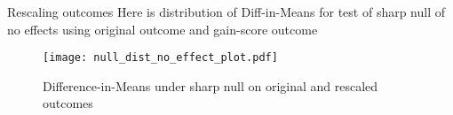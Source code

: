 \documentclass[table, xcolor = {dvipsnames}, 9pt]{beamer}
\theoremstyle{plain}
\begin{document}
\begin{frame}{Rescaling outcomes} \vfill
Here is distribution of Diff-in-Means for test of sharp null of no effects using original outcome and gain-score outcome
\begin{figure}[H]
\texttt{[image: null\_dist\_no\_effect\_plot.pdf]}
\caption{Difference-in-Means under sharp null on original and rescaled outcomes}
\end{figure}
\end{frame}
\end{document}
